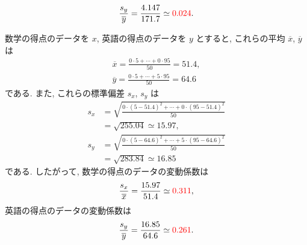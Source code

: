 \begin{qenumerate}
{\begin{align}
			\frac{s_{y}}{\overline{y}} = \frac{4.147}{171.7} \simeq \textcolor{red}{0.024}.
		\end{align}
	}
	\item{
		数学の得点のデータを $x$, 英語の得点のデータを $y$ とすると, これらの平均 $\overline{x}$, $\overline{y}$ は
		\begin{gather}
			\overline{x} = \frac{0\cdot 5 + \cdots + 0\cdot 95}{50} = 51.4, \\
			\overline{y} = \frac{0\cdot 5 + \cdots + 5\cdot 95}{50} = 64.6
		\end{gather}
		である.
		また, これらの標準偏差 $s_{x}$, $s_{y}$ は
		\begin{align}
			s_{x} &= \sqrt{\frac{0\cdot (5 - 51.4)^{2} + \cdots + 0\cdot (95 - 51.4)^{2}}{50}} \\
				&= \sqrt{255.04} \simeq 15.97, \\
			s_{y} &= \sqrt{\frac{0\cdot (5 - 64.6)^{2} + \cdots + 5\cdot (95 - 64.6)^{2}}{50}} \\
				&= \sqrt{283.84} \simeq 16.85
		\end{align}
		である.
		したがって, 数学の得点のデータの変動係数は
		\begin{align}
			\frac{s_{x}}{\overline{x}} = \frac{15.97}{51.4} \simeq \textcolor{red}{0.311}, 
		\end{align}
		英語の得点のデータの変動係数は
		\begin{align}
			\frac{s_{y}}{\overline{y}} = \frac{16.85}{64.6} \simeq \textcolor{red}{0.261}.
		\end{align}
	}
\end{qenumerate}

